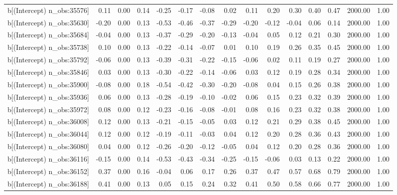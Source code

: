 \begin{table}[ht]
\begin{tabular}{rrrrrrrrrrrrrrr}
  b[(Intercept) n\_obs:35576] & 0.11 & 0.00 & 0.14 & -0.25 & -0.17 & -0.08 & 0.02 & 0.11 & 0.20 & 0.30 & 0.40 & 0.47 & 2000.00 & 1.00 \\ 
  b[(Intercept) n\_obs:35630] & -0.20 & 0.00 & 0.13 & -0.53 & -0.46 & -0.37 & -0.29 & -0.20 & -0.12 & -0.04 & 0.06 & 0.14 & 2000.00 & 1.00 \\ 
  b[(Intercept) n\_obs:35684] & -0.04 & 0.00 & 0.13 & -0.37 & -0.29 & -0.20 & -0.13 & -0.04 & 0.05 & 0.12 & 0.21 & 0.30 & 2000.00 & 1.00 \\ 
  b[(Intercept) n\_obs:35738] & 0.10 & 0.00 & 0.13 & -0.22 & -0.14 & -0.07 & 0.01 & 0.10 & 0.19 & 0.26 & 0.35 & 0.45 & 2000.00 & 1.00 \\ 
  b[(Intercept) n\_obs:35792] & -0.06 & 0.00 & 0.13 & -0.39 & -0.31 & -0.22 & -0.15 & -0.06 & 0.02 & 0.11 & 0.19 & 0.27 & 2000.00 & 1.00 \\ 
  b[(Intercept) n\_obs:35846] & 0.03 & 0.00 & 0.13 & -0.30 & -0.22 & -0.14 & -0.06 & 0.03 & 0.12 & 0.19 & 0.28 & 0.34 & 2000.00 & 1.00 \\ 
  b[(Intercept) n\_obs:35900] & -0.08 & 0.00 & 0.18 & -0.54 & -0.42 & -0.30 & -0.20 & -0.08 & 0.04 & 0.15 & 0.26 & 0.38 & 2000.00 & 1.00 \\ 
  b[(Intercept) n\_obs:35936] & 0.06 & 0.00 & 0.13 & -0.28 & -0.19 & -0.10 & -0.02 & 0.06 & 0.15 & 0.23 & 0.32 & 0.39 & 2000.00 & 1.00 \\ 
  b[(Intercept) n\_obs:35972] & 0.08 & 0.00 & 0.12 & -0.23 & -0.16 & -0.08 & -0.01 & 0.08 & 0.16 & 0.23 & 0.32 & 0.38 & 2000.00 & 1.00 \\ 
  b[(Intercept) n\_obs:36008] & 0.12 & 0.00 & 0.13 & -0.21 & -0.15 & -0.05 & 0.03 & 0.12 & 0.21 & 0.29 & 0.38 & 0.45 & 2000.00 & 1.00 \\ 
  b[(Intercept) n\_obs:36044] & 0.12 & 0.00 & 0.12 & -0.19 & -0.11 & -0.03 & 0.04 & 0.12 & 0.20 & 0.28 & 0.36 & 0.43 & 2000.00 & 1.00 \\ 
  b[(Intercept) n\_obs:36080] & 0.04 & 0.00 & 0.12 & -0.26 & -0.20 & -0.12 & -0.05 & 0.04 & 0.12 & 0.20 & 0.28 & 0.36 & 2000.00 & 1.00 \\ 
  b[(Intercept) n\_obs:36116] & -0.15 & 0.00 & 0.14 & -0.53 & -0.43 & -0.34 & -0.25 & -0.15 & -0.06 & 0.03 & 0.13 & 0.22 & 2000.00 & 1.00 \\ 
  b[(Intercept) n\_obs:36152] & 0.37 & 0.00 & 0.16 & -0.04 & 0.06 & 0.17 & 0.26 & 0.37 & 0.47 & 0.57 & 0.68 & 0.79 & 2000.00 & 1.00 \\ 
  b[(Intercept) n\_obs:36188] & 0.41 & 0.00 & 0.13 & 0.05 & 0.15 & 0.24 & 0.32 & 0.41 & 0.50 & 0.58 & 0.66 & 0.77 & 2000.00 & 1.00 \\ 

\end{tabular}
\end{table}
